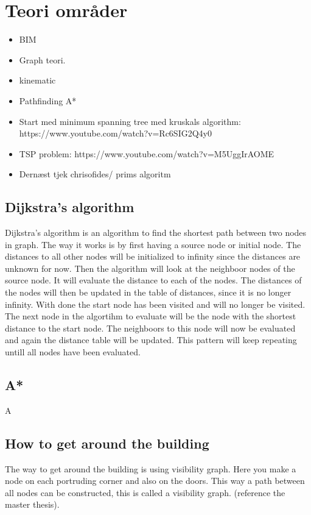 \section{Teori områder}

\begin{itemize}
    \item BIM
    \item Graph teori.
    \item kinematic 
    \item Pathfinding A*
    \item Start med minimum spanning tree med kruskals algorithm: https://www.youtube.com/watch?v=Rc6SIG2Q4y0
    \item TSP problem:
https://www.youtube.com/watch?v=M5UggIrAOME
    \item Dernæst tjek chrisofides/ prims algoritm
\end{itemize}





\subsection{Dijkstra's algorithm}
Dijkstra's algorithm is an algorithm to find the shortest path between two nodes in graph. The way it works is by first having a source node or initial node. The distances to all other nodes will be initialized to infinity since the distances are unknown for now. Then the algorithm will look at the neighboor nodes of the source node. It will evaluate the distance to each of the nodes. The distances of the nodes will then be updated in the table of distances, since it is no longer infinity. With done the start node has been visited and will no longer be visited. The next node in the algortihm to evaluate will be the node with the shortest distance to the start node. The neighboors to this node will now be evaluated and again the distance table will be updated. This pattern will keep repeating untill all nodes have been evaluated. 

\subsection{A*}
A

\subsection{How to get around the building}
The way to get around the building is using visibility graph. Here you make a node on each portruding corner and also on the doors. This way a path between all nodes can be constructed, this is called a visibility graph.
(reference the master thesis).

